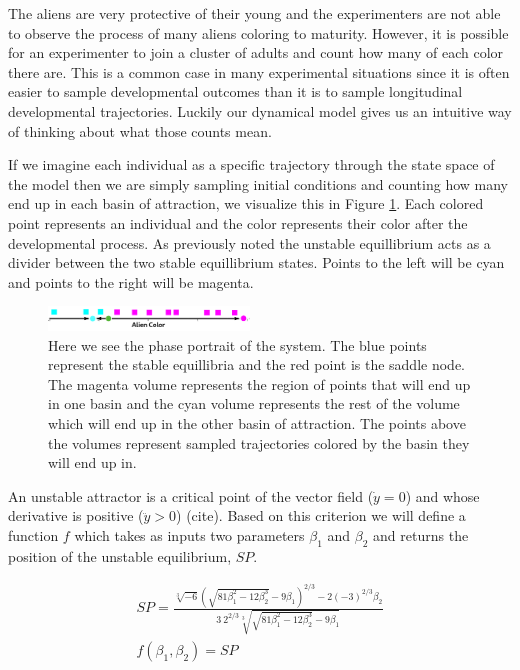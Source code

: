 \documentclass[letterpaper]{article}
\begin{document}
The aliens are very protective of their young and the experimenters are not able
to observe the process of many aliens coloring to maturity. However,
it is possible for an experimenter to join a cluster of adults and count
how many of each color there are. This is a common case in many experimental 
situations since it is often
easier to sample developmental outcomes than it is to sample longitudinal developmental
trajectories. Luckily our dynamical model gives us an intuitive way of thinking about
what those counts mean. 

If we imagine each individual as a specific trajectory through
the state space of the model then we are simply sampling initial conditions 
and counting how many end up in each basin of attraction, we visualize this 
in Figure \ref{basins}. Each
colored point represents an individual and the color represents their color after
the developmental process. As previously noted the unstable equillibrium acts as a
divider between the two stable equillibrium states. 
Points to
the left will be cyan and points to the right will be magenta. 

\begin{figure}[t]
\begin{center}
\includegraphics[width=2.1in,angle=0]{./basins.png}
\caption{Here we see the phase portrait of the system. The blue points represent
the stable equillibria and the red point is the saddle node. The magenta volume
represents the region of points that will end up in one basin and the cyan volume
represents the rest of the volume which will end up in the other basin of attraction.
The points above the volumes represent sampled trajectories colored by the 
basin they will end up in.}
\label{basins}
\end{center}
\end{figure}

An unstable attractor is a critical point of the vector field ($\dot{y} = 0$) and
whose derivative is positive ($\ddot{y} > 0$) (cite). 
Based on this criterion we will define a function $f$ which 
takes as inputs two parameters $\beta_1$ and $\beta_2$ and returns the position
of the unstable equilibrium, $SP$.

\begin{eqnarray}
SP = \frac{\sqrt[3]{-6} 
\left(\sqrt{81 \beta_1^2-12 \beta_2^3}-9 \beta_1\right)^{2/3}-2 
(-3)^{2/3} \beta_2}{3\ 2^{2/3} \sqrt[3]
{\sqrt{81 \beta_1^2-12 \beta_2^3}-9 \beta_1}}\\
f(\beta_1,\beta_2) = SP
\end{eqnarray}
\end{document}
